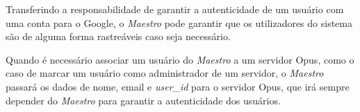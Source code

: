 Transferindo a responsabilidade de garantir a autenticidade de um usuário com uma conta para o Google, o \emph{Maestro} pode garantir que os 
utilizadores do sistema são de alguma forma rastreáveis caso seja necessário. 

Quando é necessário associar um usuário do \emph{Maestro} a um servidor Opus, como o caso de marcar um usuário como administrador de um servidor, o \emph{Maestro} passará 
os dados de nome, email e \emph{user\_id} para o servidor Opus, que irá sempre depender do \emph{Maestro} para garantir a autenticidade dos usuários.